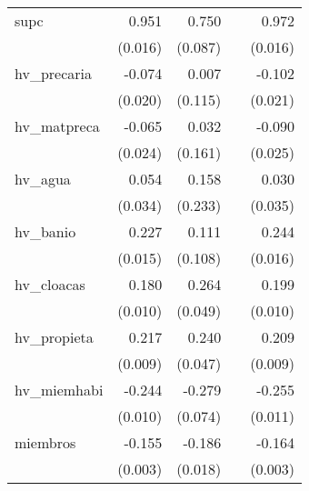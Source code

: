 {\begin{longtable}{l*{4}{D{.}{.}{-1}}}
\addlinespace
supc        &       0.951\sym{***}&       0.750\sym{***}&                     &       0.972\sym{***}\\
            &     (0.016)         &     (0.087)         &                     &     (0.016)         \\
\addlinespace
hv\_precaria &      -0.074\sym{***}&       0.007         &                     &      -0.102\sym{***}\\
            &     (0.020)         &     (0.115)         &                     &     (0.021)         \\
\addlinespace
hv\_matpreca &      -0.065\sym{**} &       0.032         &                     &      -0.090\sym{***}\\
            &     (0.024)         &     (0.161)         &                     &     (0.025)         \\
\addlinespace
hv\_agua     &       0.054         &       0.158         &                     &       0.030         \\
            &     (0.034)         &     (0.233)         &                     &     (0.035)         \\
\addlinespace
hv\_banio    &       0.227\sym{***}&       0.111         &                     &       0.244\sym{***}\\
            &     (0.015)         &     (0.108)         &                     &     (0.016)         \\
\addlinespace
hv\_cloacas  &       0.180\sym{***}&       0.264\sym{***}&                     &       0.199\sym{***}\\
            &     (0.010)         &     (0.049)         &                     &     (0.010)         \\
\addlinespace
hv\_propieta &       0.217\sym{***}&       0.240\sym{***}&                     &       0.209\sym{***}\\
            &     (0.009)         &     (0.047)         &                     &     (0.009)         \\
\addlinespace
hv\_miemhabi &      -0.244\sym{***}&      -0.279\sym{***}&                     &      -0.255\sym{***}\\
            &     (0.010)         &     (0.074)         &                     &     (0.011)         \\
\addlinespace
miembros    &      -0.155\sym{***}&      -0.186\sym{***}&                     &      -0.164\sym{***}\\
            &     (0.003)         &     (0.018)         &                     &     (0.003)         \\

\end{longtable}}
